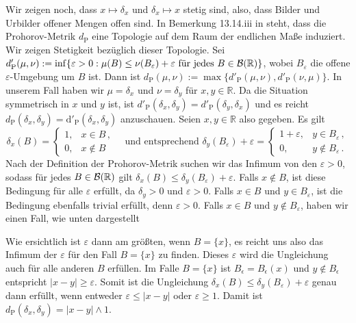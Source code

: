 \documentclass{article}
\begin{document}
Wir zeigen noch, dass $x\mapsto\delta_x$ und $\delta_x\mapsto x$ stetig sind, also, dass Bilder und Urbilder offener Mengen offen sind.
In Bemerkung 13.14.iii in \cite{klenke} steht, dass die Prohorov-Metrik $d_\mathrm{P}$ eine Topologie auf dem Raum der endlichen Maße induziert.
Wir zeigen Stetigkeit bezüglich dieser Topologie.
Sei $d'_\mathrm{P}(\mu,\nu):=\inf\{\varepsilon>0:\mu(B)\leq\nu(B_\varepsilon)+\varepsilon\text{ für jedes }B\in{\cal B}(\mathbb{R})\}$, wobei $B_\varepsilon$ die offene $\varepsilon$-Umgebung um $B$ ist.
Dann ist $d_\mathrm{P}(\mu,\nu):=\max\{d'_\mathrm{P}(\mu,\nu),d'_\mathrm{P}(\nu,\mu)\}$.
In unserem Fall haben wir $\mu=\delta_x$ und $\nu=\delta_y$ für $x,y\in\mathbb{R}$.
Da die Situation symmetrisch in $x$ und $y$ ist, ist $d'_\mathrm{P}(\delta_x,\delta_y)=d'_\mathrm{P}(\delta_y,\delta_x)$ und es reicht $d_\mathrm{P}(\delta_x,\delta_y)=\mathrm{d}'_\mathrm{P}(\delta_x,\delta_y)$ anzuschauen.
Seien $x,y\in\mathbb{R}$ also gegeben.
Es gilt
\[
\delta_x(B)=
\begin{cases}
  1,&x\in B\,,\\
  0,&x\notin B
\end{cases}
\quad\text{und entsprechend }
\delta_y(B_\varepsilon)+\varepsilon=
\begin{cases}
  1+\varepsilon,&y\in B_\varepsilon\,,\\
  0,&y\notin B_\varepsilon\,.
\end{cases}
\]
Nach der Definition der Prohorov-Metrik suchen wir das Infimum von den $\varepsilon>0$, sodass für jedes $B\in {\cal B}(\mathbb{R})$ gilt $\delta_x(B)\leq\delta_y(B_\varepsilon)+\varepsilon$.
Falls $x\notin B$, ist diese Bedingung für alle $\varepsilon$ erfüllt, da $\delta_y>0$ und $\varepsilon>0$.
Falls $x\in B$ und $y\in B_\varepsilon$, ist die Bedingung ebenfalls trivial erfüllt, denn $\varepsilon>0$.
Falls $x\in B$ und $y\notin B_\varepsilon$, haben wir einen Fall, wie unten dargestellt
\begin{center}
\end{center}
Wie ersichtlich ist $\varepsilon$ dann am größten, wenn $B=\{x\}$, es reicht uns also das Infimum der $\varepsilon$ für den Fall $B=\{x\}$ zu finden.
Dieses $\varepsilon$ wird die Ungleichung auch für alle anderen $B$ erfüllen.
Im Falle $B=\{x\}$ ist $B_\epsilon=B_\epsilon(x)$ und $y\notin B_\epsilon$ entspricht $|x-y|\geq\varepsilon$.
Somit ist die Ungleichung $\delta_x(B)\leq\delta_y(B_\varepsilon)+\varepsilon$ genau dann erfüllt, wenn entweder $\varepsilon\leq|x-y|$ oder $\varepsilon\geq1$.
Damit ist $d_\mathrm{P}(\delta_x,\delta_y)=|x-y|\wedge1$.
\end{document}

